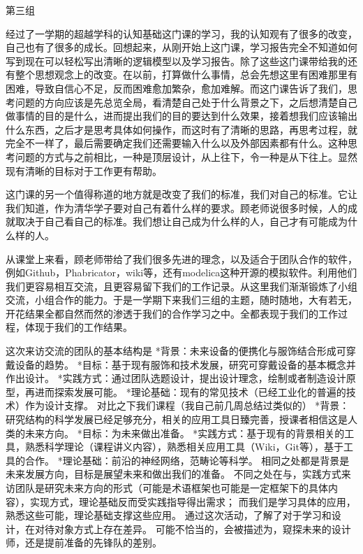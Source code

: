 \documentclass[11pt,fleqn]{book}
\makeatletter
\numberwithin{dummy}{section}
\theoremstyle{ocrenumbox}
\theoremstyle{blacknumex}
\theoremstyle{blacknumbox}
\theoremstyle{ocrenum}
\newenvironment{remark}[1]{\par\vspace{10pt}\small %
	\begin{list}{}{
			\leftmargin=35pt %
			\rightmargin=25pt}\item\ignorespaces %
		\makebox[-2.5pt]{\begin{tikzpicture}[overlay]
			\node[draw=ocre!60,line width=1pt,circle,fill=ocre!25,font=\sffamily\bfseries,inner sep=2pt,outer sep=0pt] at (-15pt,0pt){\textcolor{ocre}{#1}};\end{tikzpicture}} %
		\advance\baselineskip -1pt}{\end{list}\vskip5pt} %
\renewcommand{\subsection}{\@startsection {subsection}{2}{\z@}
	{-3ex \@plus -0.1ex \@minus -.4ex}
	{0.5ex \@plus.2ex }
	{\normalfont\sffamily\bfseries}}
\newlength\esp
\makeatother
\begin{document}
\subsection{第三组}

\begin{remark}{刘}
	经过了一学期的超越学科的认知基础这门课的学习，我的认知观有了很多的改变，自己也有了很多的成长。回想起来，从刚开始上这门课，学习报告完全不知道如何写到现在可以轻松写出清晰的逻辑模型以及学习报告。除了这些这门课带给我的还有整个思想观念上的改变。在以前，打算做什么事情，总会先想这里有困难那里有困难，导致自信心不足，反而困难愈加繁杂，愈加难解。而这门课告诉了我们，思考问题的方向应该是先总览全局，看清楚自己处于什么背景之下，之后想清楚自己做事情的目的是什么，进而提出我们的目的要达到什么效果，接着想我们应该输出什么东西，之后才是思考具体如何操作，而这时有了清晰的思路，再思考过程，就完全不一样了，最后需要确定我们还需要输入什么以及外部因素都有什么。这种思考问题的方式与之前相比，一种是顶层设计，从上往下，令一种是从下往上。显然现有清晰的目标对于工作更有帮助。
	
	这门课的另一个值得称道的地方就是改变了我们的标准，我们对自己的标准。它让我们知道，作为清华学子要对自己有着什么样的要求。顾老师说很多时候，人的成就取决于自己看自己的标准。我们想让自己成为什么样的人，自己才有可能成为什么样的人。
	
	从课堂上来看，顾老师带给了我们很多先进的理念，以及适合于团队合作的软件，例如Github，Phabricator，wiki等，还有modelica这种开源的模拟软件。利用他们我们更容易相互交流，且更容易留下我们的工作记录。从这里我们渐渐锻炼了小组交流，小组合作的能力。于是一学期下来我们三组的主题，随时随地，大有若无，开花结果全都自然而然的渗透于我们的合作学习之中。全都表现于我们的工作过程，体现于我们的工作结果。
\end{remark}

\begin{remark}{黄}
	这次来访交流的团队的基本结构是
	*背景：未来设备的便携化与服饰结合形成可穿戴设备的趋势。
	*目标：基于现有服饰和技术发展，研究可穿戴设备的基本概念并作出设计。
	*实践方式：通过团队选题设计，提出设计理念，绘制或者制造设计原型，再进而探索发展可能。
	*理论基础：现有的常见技术（已经工业化的普遍的技术）作为设计支撑。
	对比之下我们课程（我自己前几周总结过类似的）
	*背景：研究结构的科学发展已经足够充分，相关的应用工具日臻完善，授课者相信这是人类的未来方向。
	*目标：为未来做出准备。
	*实践方式：基于现有的背景相关的工具，熟悉科学理论（课程讲义内容），熟悉相关应用工具（Wiki，Git等），基于工具的合作。
	*理论基础：前沿的神经网络，范畴论等科学。
	相同之处都是背景是未来发展方向，目标是展望未来和做出我们的准备。
	不同之处在与，实践方式来访团队是研究未来方向的形式（可能是术语框架也可能是一定框架下的具体内容），实现方式，理论基础反而受实践指导得出需求；
	而我们是学习具体的应用，熟悉这些可能，理论基础支撑这些应用。
	通过这次活动，了解了对于学习和设计，在对待对象方式上存在差异。
	可能不恰当的，会被描述为，窥探未来的设计师，还是提前准备的先锋队的差别。
\end{remark}
\end{document}
